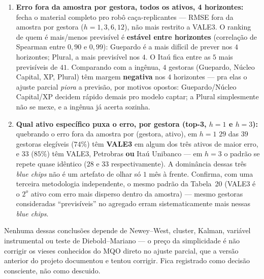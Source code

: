 \documentclass[11pt,a4paper]{article}
\begin{document}
\begin{enumerate}[topsep=2pt,itemsep=3pt]
horizontes --- mais forte e mais estável que o $57$--$78\%$ da versão só-VALE3, porque agregar
milhões de observações por mês elimina o ruído de um painel pequeno. A margem cresce
monotonicamente com o horizonte ($1{,}8\%\to7{,}0\%$), sem o pico seguido de queda que a versão
só-VALE3 mostrava em $h=12$ (aqui a amostra de teste continua grande, $1{,}4$ milhões de obs.).
\item \textbf{Erro fora da amostra por gestora, todos os ativos, 4 horizontes:} fecha o material
completo pro robô caça-replicantes --- RMSE fora da amostra por gestora ($h=1,3,6,12$), não mais
restrito a VALE3. O ranking de quem é mais/menos previsível é \textbf{estável entre horizontes}
(correlação de Spearman entre $0{,}90$ e $0{,}99$): Guepardo é a mais difícil de prever nos $4$
horizontes; Plural, a mais previsível nos $4$. O Itaú fica entre as $5$ mais previsíveis de $41$.
Comparando com a ingênua, $4$ gestoras (Guepardo, Núcleo Capital, XP, Plural) têm margem
\textbf{negativa} nos $4$ horizontes --- pra elas o ajuste parcial \emph{piora} a previsão, por
motivos opostos: Guepardo/Núcleo Capital/XP decidem rápido demais pro modelo captar; a Plural
simplesmente não se mexe, e a ingênua já acerta sozinha.
\item \textbf{Qual ativo específico puxa o erro, por gestora (top-3, $h=1$ e $h=3$):} quebrando o
erro fora da amostra por (gestora, ativo), em $h=1$ $29$ das $39$ gestoras elegíveis ($74\%$) têm
\textbf{VALE3} em algum dos três ativos de maior erro, e $33$ ($85\%$) têm VALE3, Petrobras
\textbf{ou} Itaú Unibanco --- em $h=3$ o padrão se repete quase idêntico ($28$ e $33$
respectivamente). A dominância dessas três \emph{blue chips} não é um artefato de olhar só $1$
mês à frente. Confirma, com uma terceira metodologia independente, o mesmo padrão da Tabela~20
(VALE3 é o $2^o$ ativo com erro mais disperso dentro da amostra) --- mesmo gestoras consideradas
``previsíveis'' no agregado erram sistematicamente mais nessas \emph{blue chips}.
\end{enumerate}

Nenhuma dessas conclusões depende de Newey--West, cluster, Kalman, variável instrumental ou
teste de Diebold--Mariano --- o preço da simplicidade é não corrigir os vieses conhecidos do
MQO direto no ajuste parcial, que a versão anterior do projeto documentou e tentou corrigir.
Fica registrado como decisão consciente, não como descuido.
\end{document}
